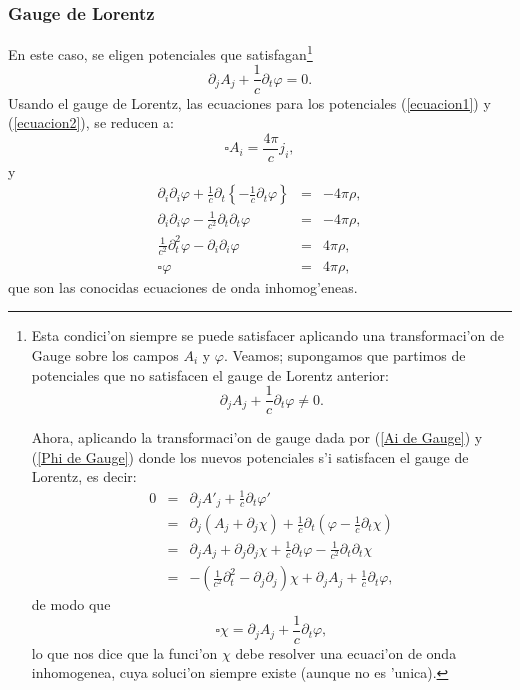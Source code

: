 \subsubsection{Gauge de Lorentz}
En este caso, se eligen potenciales que satisfagan\footnote{Esta condici'on
siempre se puede satisfacer aplicando una
transformaci'on de Gauge sobre los campos $A_{i}$ y $\varphi.$ Veamos;
supongamos que partimos de potenciales que no satisfacen el gauge de Lorentz
anterior:
\begin{equation}
\partial_{j}A_{j}+\frac{1}{c}\partial_{t}\varphi\neq0 .
\end{equation}

Ahora, aplicando la transformaci'on de gauge dada por (\ref{Ai de Gauge}) y
(\ref{Phi de Gauge}) donde los nuevos potenciales s'i satisfacen el gauge de
Lorentz, es decir:
\begin{eqnarray}
0&=&\partial_{j}A'_{j}+\frac{1}{c}\partial_{t}\varphi'\\
& = &\partial_{j}\left( A_{j}+\partial_{j}\chi\right)
+\frac{1}{c}\partial_{t}\left( \varphi-\frac{1}{c}\partial_{t}\chi\right) \\
& = &\partial_{j}A_{j}+\partial_{j}\partial_{j}\chi+\frac{1}{c}\partial
_{t}\varphi-\frac{1}{c^{2}}\partial_{t}\partial_{t}\chi \\
& = &-\left( \frac{1}{c^{2}}\partial_{t}^{2}-\partial_{j}\partial_{j}\right)
\chi+\partial_{j}A_{j}+\frac{1}{c}\partial_{t}\varphi ,
\end{eqnarray}
de modo que
\begin{equation}
\square\chi = \partial_{j}A_{j}+\frac{1}{c}\partial_{t}\varphi ,
\end{equation} 
lo que nos dice que la funci'on $\chi$ debe resolver una ecuaci'on de onda
inhomogenea, cuya soluci'on siempre existe (aunque no es 'unica).}
\begin{equation}
\partial_{j}A_{j}+\frac{1}{c}\partial_{t}\varphi=0\label{Gauge de Lorentz} .
\end{equation}
Usando el gauge de Lorentz, las ecuaciones para los potenciales
(\ref{ecuacion1}) y (\ref{ecuacion2}), se reducen a: 
\begin{equation}
\square A_{i}=\frac{4\pi}{c} j_{i},
\end{equation}
y
\begin{eqnarray}
\partial_{i}\partial_{i}\varphi+\frac{1}{c}\partial_{t}\left\{
-\frac{1}{c}\partial_{t}\varphi\right\} & = &-4\pi\rho ,\\
\partial_{i}\partial_{i}\varphi-\frac{1}{c^2}\partial_{t}\partial_{t}\varphi & =
&-4\pi \rho ,\\
\frac{1}{c^{2}}\partial_{t}^{2}\varphi-\partial_{i}\partial_{i}\varphi &
=&4\pi \rho , \\
\square\varphi & = &4\pi \rho,
\end{eqnarray}
que son las conocidas ecuaciones de onda inhomog'eneas.

